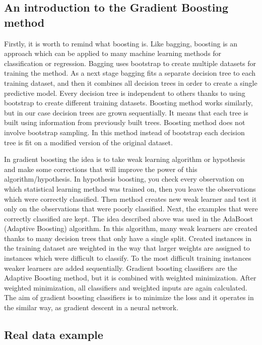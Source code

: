 \subsection{An introduction to the Gradient Boosting method}
Firstly, it is worth to remind what boosting is. Like bagging, boosting is an approach which can be applied to many machine learning methods for classification or regression. Bagging uses bootstrap to create multiple datasets for training the method. As a next stage bagging fits a separate decision tree to each training dataset, and then it combines all decision trees in order to create a single predictive model. Every decision tree is independent to others thanks to using bootstrap to create different training datasets. Boosting method works similarly, but in our case decision trees are grown sequentially. It means that each tree is built using information from previously built trees. Boosting method does not involve bootstrap sampling. In this method instead of bootstrap each decision tree is fit on a modified version of the original dataset.

In gradient boosting the idea is to take weak learning algorithm or hypothesis and make some corrections that will improve the power of this algorithm/hypothesis. In hypothesis boosting, you check every observation on which statistical learning method was trained on, then you leave the observations which were correctly classified. Then method creates new weak learner and test it only on the observations that were poorly classified. Next, the examples that were correctly classified are kept.
The idea described above was used in the AdaBoost (Adaptive Boosting) algorithm. In this algorithm, many weak learners are created thanks to many decision trees that only have a single split. Created instances in the training dataset are weighted in the way that larger weights are assigned to instances which were difficult to classify. To the most difficult training instances weaker learners are added sequentially.
Gradient boosting classifiers are the Adaptive Boosting method, but it is combined with weighted minimization. After weighted minimization, all classifiers and weighted inputs are again calculated. The aim of gradient boosting classifiers is to minimize the loss and it operates in the similar way, as gradient descent in a neural network.
\subsection{Real data example}

